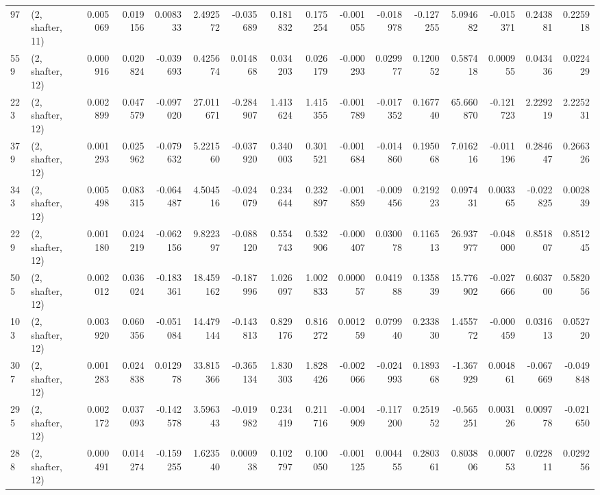 \begin{tabular}{llrrrrrrrrrrrrrr}
97  &  (2, shafter, 11) &   0.005069 &  0.019156 &  0.008333 &    2.492572 & -0.035689 &   0.181832 &   0.175254 & -0.001055 & -0.018978 & -0.127255 &    5.094682 & -0.015371 &   0.243881 &   0.225918 \\
559 &  (2, shafter, 12) &   0.000916 &  0.020824 & -0.039693 &    0.425674 &  0.014868 &   0.034203 &   0.026179 & -0.000293 &  0.029977 &  0.120052 &    0.587418 &  0.000955 &   0.043436 &   0.022429 \\
223 &  (2, shafter, 12) &   0.002899 &  0.047579 & -0.097020 &   27.011671 & -0.284907 &   1.413624 &   1.415355 & -0.001789 & -0.017352 &  0.167740 &   65.660870 & -0.121723 &   2.229219 &   2.225231 \\
379 &  (2, shafter, 12) &   0.001293 &  0.025962 & -0.079632 &    5.221560 & -0.037920 &   0.340003 &   0.301521 & -0.001684 & -0.014860 &  0.195068 &    7.016216 & -0.011196 &   0.284647 &   0.266326 \\
343 &  (2, shafter, 12) &   0.005498 &  0.083315 & -0.064487 &    4.504516 & -0.024079 &   0.234644 &   0.232897 & -0.001859 & -0.009456 &  0.219223 &    0.097431 &  0.003365 &  -0.022825 &   0.002839 \\
229 &  (2, shafter, 12) &   0.001180 &  0.024219 & -0.062156 &    9.822397 & -0.088120 &   0.554743 &   0.532906 & -0.000407 &  0.030078 &  0.116513 &   26.937977 & -0.048000 &   0.851807 &   0.851245 \\
505 &  (2, shafter, 12) &   0.002012 &  0.036024 & -0.183361 &   18.459162 & -0.187996 &   1.026097 &   1.002833 &  0.000057 &  0.041988 &  0.135839 &   15.776902 & -0.027666 &   0.603700 &   0.582056 \\
103 &  (2, shafter, 12) &   0.003920 &  0.060356 & -0.051084 &   14.479144 & -0.143813 &   0.829176 &   0.816272 &  0.001259 &  0.079940 &  0.233830 &    1.455772 & -0.000459 &   0.031613 &   0.052720 \\
307 &  (2, shafter, 12) &   0.001283 &  0.024838 &  0.012978 &   33.815366 & -0.365134 &   1.830303 &   1.828426 & -0.002066 & -0.024993 &  0.189368 &   -1.367929 &  0.004861 &  -0.067669 &  -0.049848 \\
295 &  (2, shafter, 12) &   0.002172 &  0.037093 & -0.142578 &    3.596343 & -0.019982 &   0.234419 &   0.211716 & -0.004909 & -0.117200 &  0.251952 &   -0.565251 &  0.003126 &   0.009778 &  -0.021650 \\
288 &  (2, shafter, 12) &   0.000491 &  0.014274 & -0.159255 &    1.623540 &  0.000938 &   0.102797 &   0.100050 & -0.001125 &  0.004455 &  0.280361 &    0.803806 &  0.000753 &   0.022811 &   0.029256 \\

\end{tabular}
